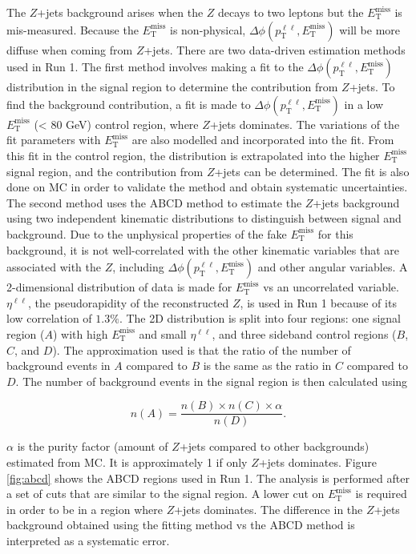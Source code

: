 The $Z$+jets background arises when the $Z$ decays to two leptons but the $E_\text{T}^\text{miss}$ is mis-measured. Because the $E_\text{T}^\text{miss}$ is non-physical, $\Delta \phi (p_\text{T}^{\ell\ell}, E_\text{T}^{\text{miss}})$ will be more diffuse when coming from $Z$+jets. There are two data-driven estimation methods used in Run 1. The first method involves making a fit to the $\Delta \phi (p_\text{T}^{\ell\ell}, E_\text{T}^{\text{miss}})$ distribution in the signal region to determine the contribution from $Z$+jets. To find the background contribution, a fit is made to $\Delta \phi (p_\text{T}^{\ell\ell}, E_\text{T}^{\text{miss}})$ in a low $E_\text{T}^\text{miss}$ (< 80 GeV) control region, where $Z$+jets dominates. The variations of the fit parameters with $E_\text{T}^\text{miss}$ are also modelled and incorporated into the fit. From this fit in the control region, the distribution is extrapolated into the higher $E_\text{T}^\text{miss}$ signal region, and the contribution from $Z$+jets can be determined. The fit is also done on MC in order to validate the method and obtain systematic uncertainties. The second method uses the ABCD method to estimate the $Z$+jets background using two independent kinematic distributions to distinguish between signal and background. Due to the unphysical properties of the fake $E_\text{T}^{\text{miss}}$ for this background, it is not well-correlated with the other kinematic variables that are associated with the $Z$, including $\Delta \phi (p_\text{T}^{\ell\ell}, E_\text{T}^{\text{miss}})$ and other angular variables. A 2-dimensional distribution of data is made for $E_\text{T}^{\text{miss}}$ vs an uncorrelated variable. $\eta^{\ell\ell}$, the pseudorapidity of the reconstructed $Z$, is used in Run 1 because of its low correlation of $1.3\%$. The 2D distribution is split into four regions: one signal region ($A$) with high $E_\text{T}^{\text{miss}}$ and small $\eta^{\ell\ell}$, and three sideband control regions ($B$, $C$, and $D$). The approximation used is that the ratio of the number of background events in $A$ compared to $B$ is the same as the ratio in $C$ compared to $D$. The number of background events in the signal region is then calculated using \cite{Barberio:1529950}

\begin{equation}
n(A) = \frac{n(B) \times n(C) \times \alpha}{n(D)}.
\end{equation}

\noindent $\alpha$ is the purity factor (amount of $Z$+jets compared to other backgrounds) estimated from MC. It is approximately 1 if only $Z$+jets dominates. Figure \ref{fig:abcd} shows the ABCD regions used in Run 1. The analysis is performed after a set of cuts that are similar to the signal region. A lower cut on $E_\text{T}^{\text{miss}}$ is required in order to be in a region where $Z$+jets dominates. The difference in the $Z$+jets background obtained using the fitting method vs the ABCD method is interpreted as a systematic error.

